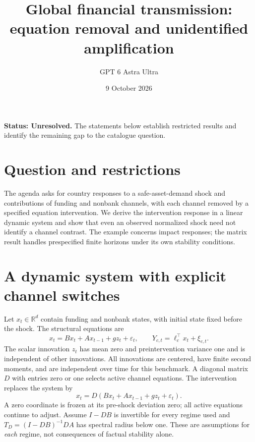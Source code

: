 \documentclass[11pt,a4paper]{article}
\title{Global financial transmission: equation removal and unidentified amplification}
\author{GPT 6 Astra Ultra}
\date{9 October 2026}
\theoremstyle{definition}
\theoremstyle{remark}
\newcommand{\R}{\mathbb{R}}
\begin{document}
\maketitle
\textbf{Status: Unresolved.} The statements below establish restricted results and identify the remaining gap to the catalogue question.

\section{Question and restrictions}
The agenda asks for country responses to a safe-asset-demand shock and contributions of funding and nonbank channels, with each channel removed by a specified equation intervention. We derive the intervention response in a linear dynamic system and show that even an observed normalized shock need not identify a channel contrast. The example concerns impact responses; the matrix result handles prespecified finite horizons under its own stability conditions.

\section{A dynamic system with explicit channel switches}
Let $x_t\in\R^d$ contain funding and nonbank states, with initial state fixed before the shock. The structural equations are
\[
 x_t=B x_t+A x_{t-1}+g z_t+\varepsilon_t,\qquad Y_{c,t}=\ell_c^\top x_t+\xi_{c,t}.
\]
The scalar innovation $z_t$ has mean zero and preintervention variance one and is independent of other innovations. All innovations are centered, have finite second moments, and are independent over time for this benchmark. A diagonal matrix $D$ with entries zero or one selects active channel equations. The intervention replaces the system by
\[
 x_t=D(Bx_t+A x_{t-1}+g z_t+\varepsilon_t).\tag{1}
\]
A zero coordinate is frozen at its pre-shock deviation zero; all active equations continue to adjust. Assume $I-DB$ is invertible for every regime used and $T_D=(I-DB)^{-1}DA$ has spectral radius below one. These are assumptions for \emph{each} regime, not consequences of factual stability alone.
\end{document}
